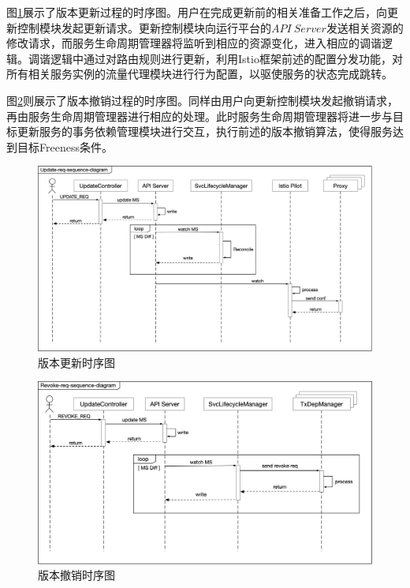 \documentclass[macfonts,master]{njuthesis}
\begin{document}
图\ref{fig:update_sequence}展示了版本更新过程的时序图。用户在完成更新前的相关准备工作之后，向更新控制模块发起更新请求。更新控制模块向运行平台的$API~Server$发送相关资源的修改请求，而服务生命周期管理器将监听到相应的资源变化，进入相应的调谐逻辑。调谐逻辑中通过对路由规则进行更新，利用Istio框架前述的配置分发功能，对所有相关服务实例的流量代理模块进行行为配置，以驱使服务的状态完成跳转。

图\ref{fig:revoke_sequence}则展示了版本撤销过程的时序图。同样由用户向更新控制模块发起撤销请求，再由服务生命周期管理器进行相应的处理。此时服务生命周期管理器将进一步与目标更新服务的事务依赖管理模块进行交互，执行前述的版本撤销算法，使得服务达到目标Freeness条件。

\begin{figure}[!htbp]
  \centering
  \includegraphics[width= 1.0\textwidth]{image/update_sequence.png}
  \caption{版本更新时序图}
  \label{fig:update_sequence}
\end{figure}

\begin{figure}[!htbp]
  \centering
  \includegraphics[width= 1.0\textwidth]{image/revoke_sequence.png}
  \caption{版本撤销时序图}
  \label{fig:revoke_sequence}
\end{figure}
\end{document}
